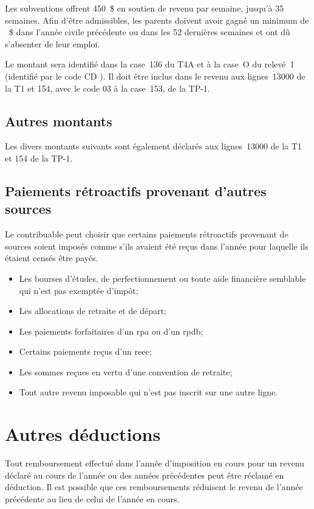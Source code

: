 Les subventions offrent 450~\$ en soutien de revenu par semaine, jusqu'à 35 semaines. Afin d'être admissibles, les parents doivent avoir gagné un minimum de ~\$ dans l'année civile précédente ou dans les 52 dernières semaines et ont dû s'absenter de leur emploi.

Le montant sera identifié dans la case~136 du T4A et à la case~O du relevé~1 (identifié par le code \og CD \fg{}). Il doit être inclus dans le revenu aux lignes~13000 de la T1 et 154, avec le code 03 à la case~153, de la TP-1.


\subsection{Autres montants}
Les divers montants suivants sont également déclarés aux lignes~13000 de la T1 et 154 de la TP-1.


\subsection{Paiements rétroactifs provenant d'autres sources}
Le contribuable peut choisir que certains paiements rétroactifs provenant de sources soient imposés comme s'ils avaient été reçus dans l'année pour laquelle ils étaient censés être payés.
\begin{itemize}
	\item Les bourses d'études, de perfectionnement ou toute aide financière semblable qui n'est pas exemptée d'impôt;
	\item Les allocations de retraite et de départ;
	\item Les paiements forfaitaires d'un \acrshort{rpa} ou d'un \acrshort{rpdb}; 
	\item Certains paiements reçus d'un \acrfull{reee};
	\item Les sommes reçues en vertu d'une convention de retraite;
	\item Tout autre revenu imposable qui n'est pas inscrit sur une autre ligne.
\end{itemize}



\section{Autres déductions}
\begin{intro}
	Tout remboursement effectué dans l'année d'imposition en cours pour un revenu déclaré au cours de l'année ou des années précédentes peut être réclamé en déduction. Il est possible que ces remboursements réduisent le revenu de l'année précédente au lieu de celui de l'année en cours.
\end{intro}


